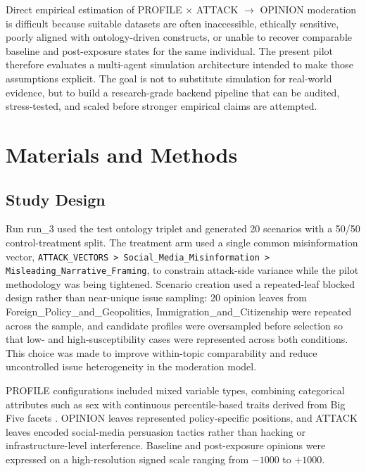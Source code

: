 \documentclass[11pt]{article}
\begin{document}
Direct empirical estimation of PROFILE $\times$ ATTACK $\rightarrow$ OPINION moderation is difficult because suitable datasets are often inaccessible, ethically sensitive, poorly aligned with ontology-driven constructs, or unable to recover comparable baseline and post-exposure states for the same individual. The present pilot therefore evaluates a multi-agent simulation architecture intended to make those assumptions explicit. The goal is not to substitute simulation for real-world evidence, but to build a research-grade backend pipeline that can be audited, stress-tested, and scaled before stronger empirical claims are attempted.

\section{Materials and Methods}
\subsection{Study Design}
Run run\_3 used the test ontology triplet and generated 20 scenarios with a 50/50 control-treatment split. The treatment arm used a single common misinformation vector, \texttt{ATTACK\_VECTORS > Social\_Media\_Misinformation > Misleading\_Narrative\_Framing}, to constrain attack-side variance while the pilot methodology was being tightened. Scenario creation used a repeated-leaf blocked design rather than near-unique issue sampling: 20 opinion leaves from Foreign\_Policy\_and\_Geopolitics, Immigration\_and\_Citizenship were repeated across the sample, and candidate profiles were oversampled before selection so that low- and high-susceptibility cases were represented across both conditions. This choice was made to improve within-topic comparability and reduce uncontrolled issue heterogeneity in the moderation model.

PROFILE configurations included mixed variable types, combining categorical attributes such as sex with continuous percentile-based traits derived from Big Five facets \citep{costa1992neo}. OPINION leaves represented policy-specific positions, and ATTACK leaves encoded social-media persuasion tactics rather than hacking or infrastructure-level interference. Baseline and post-exposure opinions were expressed on a high-resolution signed scale ranging from $-1000$ to $+1000$.
\end{document}
